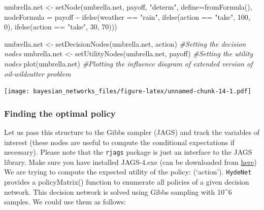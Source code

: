 \documentclass[
]{article}
\newenvironment{Shaded}{\begin{snugshade}}{\end{snugshade}}
\newcommand{\AttributeTok}[1]{\textcolor[rgb]{0.77,0.63,0.00}{#1}}
\newcommand{\CommentTok}[1]{\textcolor[rgb]{0.56,0.35,0.01}{\textit{#1}}}
\newcommand{\DecValTok}[1]{\textcolor[rgb]{0.00,0.00,0.81}{#1}}
\newcommand{\FunctionTok}[1]{\textcolor[rgb]{0.00,0.00,0.00}{#1}}
\newcommand{\NormalTok}[1]{#1}
\newcommand{\OtherTok}[1]{\textcolor[rgb]{0.56,0.35,0.01}{#1}}
\newcommand{\SpecialCharTok}[1]{\textcolor[rgb]{0.00,0.00,0.00}{#1}}
\newcommand{\StringTok}[1]{\textcolor[rgb]{0.31,0.60,0.02}{#1}}
\begin{document}
\begin{Shaded}
\begin{Highlighting}[]
\NormalTok{umbrella.net }\OtherTok{\textless{}{-}} \FunctionTok{setNode}\NormalTok{(umbrella.net, payoff, }\StringTok{"determ"}\NormalTok{, }\AttributeTok{define=}\FunctionTok{fromFormula}\NormalTok{(),}
                  \AttributeTok{nodeFormula =}\NormalTok{ payoff }\SpecialCharTok{\textasciitilde{}} \FunctionTok{ifelse}\NormalTok{(weather }\SpecialCharTok{==} \StringTok{"rain"}\NormalTok{,}
                                                      \FunctionTok{ifelse}\NormalTok{(action }\SpecialCharTok{==} \StringTok{"take"}\NormalTok{, }\DecValTok{100}\NormalTok{, }\DecValTok{0}\NormalTok{),}
                                                             \FunctionTok{ifelse}\NormalTok{(action }\SpecialCharTok{==} \StringTok{"take"}\NormalTok{, }\DecValTok{30}\NormalTok{, }\DecValTok{70}\NormalTok{)))}

\NormalTok{umbrella.net }\OtherTok{\textless{}{-}} \FunctionTok{setDecisionNodes}\NormalTok{(umbrella.net, action) }\CommentTok{\#Setting the decision nodes}
\NormalTok{umbrella.net }\OtherTok{\textless{}{-}} \FunctionTok{setUtilityNodes}\NormalTok{(umbrella.net, payoff) }\CommentTok{\#Setting the utility nodes}
\FunctionTok{plot}\NormalTok{(umbrella.net) }\CommentTok{\#Plotting the influence diagram of extended version of oil{-}wildcatter problem}
\end{Highlighting}
\end{Shaded}

\texttt{[image: bayesian\_networks\_files/figure-latex/unnamed-chunk-14-1.pdf]}

\hypertarget{finding-the-optimal-policy}{%
\subsubsection{Finding the optimal policy}\label{finding-the-optimal-policy}}

Let us pass this structure to the Gibbs sampler (JAGS) and track the variables of interest (these nodes are useful to compute the conditional expectations if necessary).
Please note that the \texttt{rjags} package is just an interface to the JAGS library. Make sure you have installed JAGS-4.exe (can be downloaded from \href{http://www.sourceforge.net/projects/mcmc-jags/files}{here})
We are trying to compute the expected utility of the policy: (`action').
\texttt{HydeNet} provides a policyMatrix() function to enumerate all policies of a given decision network. This decision network is solved using Gibbs sampling with 10\^{}6 samples. We could use them as follows:
\end{document}
